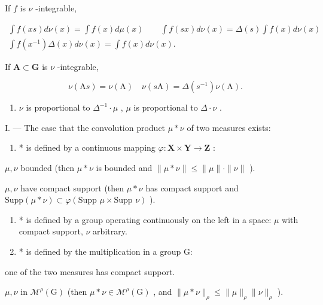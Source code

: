 If \(f\) is \(\nu\) -integrable,

\[
\begin{array}{c} \int f (x s) d \nu (x) = \int f (x) d \mu (x) \qquad \int f (s x) d \nu (x) = \Delta (s) \int f (x) d \nu (x) \\ \int f (x ^ {- 1}) \Delta (x) d \nu (x) = \int f (x) d \nu (x). \end{array}
\]

If \(\mathbf{A}\subset \mathbf{G}\) is \(\nu\) -integrable,

\[
\nu (\mathrm{A} s) = \nu (\mathrm{A}) \quad \nu (s \mathrm{A}) = \Delta (s ^ {- 1}) \nu (\mathrm{A}).
\]

\begin{enumerate}
\def\labelenumi{\arabic{enumi})}
\setcounter{enumi}{2}
\tightlist
\item
  \(\nu\) is proportional to \(\Delta^{-1} \cdot \mu\) , \(\mu\) is proportional to \(\Delta \cdot \nu\) .
\end{enumerate}


I. --- The case that the convolution product \(\mu * \nu\) of two measures exists:

\begin{enumerate}
\def\labelenumi{(\alph{enumi})}
\tightlist
\item
  * is defined by a continuous mapping \(\varphi : \mathbf{X} \times \mathbf{Y} \to \mathbf{Z}\) :
\end{enumerate}

\(\mu, \nu\) bounded (then \(\mu * \nu\) is bounded and \(\| \mu * \nu \| \leqslant \| \mu \| \cdot \| \nu \|\) ).

\(\mu, \nu\) have compact support (then \(\mu * \nu\) has compact support and \(\text{Supp}(\mu * \nu) \subset \varphi(\text{Supp } \mu \times \text{Supp } \nu)\) ).

\begin{enumerate}
\def\labelenumi{(\alph{enumi})}
\setcounter{enumi}{1}
\item
  * is defined by a group operating continuously on the left in a space: \(\mu\) with compact support, \(\nu\) arbitrary.
\item
  * is defined by the multiplication in a group G:
\end{enumerate}

one of the two measures has compact support.

\(\mu, \nu\) in \(\mathcal{M}^{\rho}(\mathrm{G})\) (then \(\mu * \nu \in \mathcal{M}^{\rho}(\mathrm{G})\) , and \(\| \mu * \nu \|_{\rho} \leqslant \| \mu \|_{\rho} \| \nu \|_{\rho}\) ).

